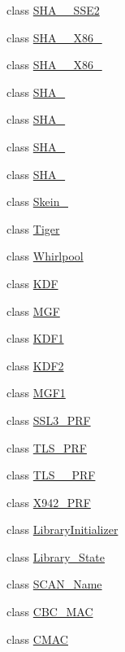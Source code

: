 \begin{DoxyCompactItemize}
class \hyperlink{classBotan_1_1SHA__160__SSE2}{S\-H\-A\-\_\-\_\-\-S\-S\-E2}
\item 
class \hyperlink{classBotan_1_1SHA__160__X86__32}{S\-H\-A\-\_\-\_\-\-X86\-\_}
\item 
class \hyperlink{classBotan_1_1SHA__160__X86__64}{S\-H\-A\-\_\-\_\-\-X86\-\_}
\item 
class \hyperlink{classBotan_1_1SHA__224}{S\-H\-A\-\_}
\item 
class \hyperlink{classBotan_1_1SHA__256}{S\-H\-A\-\_}
\item 
class \hyperlink{classBotan_1_1SHA__384}{S\-H\-A\-\_}
\item 
class \hyperlink{classBotan_1_1SHA__512}{S\-H\-A\-\_}
\item 
class \hyperlink{classBotan_1_1Skein__512}{Skein\-\_}
\item 
class \hyperlink{classBotan_1_1Tiger}{Tiger}
\item 
class \hyperlink{classBotan_1_1Whirlpool}{Whirlpool}
\item 
class \hyperlink{classBotan_1_1KDF}{K\-D\-F}
\item 
class \hyperlink{classBotan_1_1MGF}{M\-G\-F}
\item 
class \hyperlink{classBotan_1_1KDF1}{K\-D\-F1}
\item 
class \hyperlink{classBotan_1_1KDF2}{K\-D\-F2}
\item 
class \hyperlink{classBotan_1_1MGF1}{M\-G\-F1}
\item 
class \hyperlink{classBotan_1_1SSL3__PRF}{S\-S\-L3\-\_\-\-P\-R\-F}
\item 
class \hyperlink{classBotan_1_1TLS__PRF}{T\-L\-S\-\_\-\-P\-R\-F}
\item 
class \hyperlink{classBotan_1_1TLS__12__PRF}{T\-L\-S\-\_\-\_\-\-P\-R\-F}
\item 
class \hyperlink{classBotan_1_1X942__PRF}{X942\-\_\-\-P\-R\-F}
\item 
class \hyperlink{classBotan_1_1LibraryInitializer}{Library\-Initializer}
\item 
class \hyperlink{classBotan_1_1Library__State}{Library\-\_\-\-State}
\item 
class \hyperlink{classBotan_1_1SCAN__Name}{S\-C\-A\-N\-\_\-\-Name}
\item 
class \hyperlink{classBotan_1_1CBC__MAC}{C\-B\-C\-\_\-\-M\-A\-C}
\item 
class \hyperlink{classBotan_1_1CMAC}{C\-M\-A\-C}
\item 

\end{DoxyCompactItemize}
